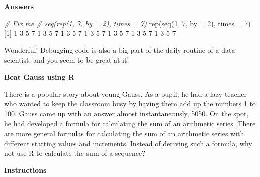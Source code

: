 \documentclass[]{article}
\newcommand{\hlnum}[1]{\textcolor[rgb]{0.816,0.125,0.439}{#1}}%
\newcommand{\hlcom}[1]{\textcolor[rgb]{0.502,0.502,0.502}{\textit{#1}}}%
\newcommand{\hlstd}[1]{\textcolor[rgb]{0.251,0.251,0.251}{#1}}%
\newcommand{\hlkwc}[1]{\textcolor[rgb]{0.251,0.251,0.251}{#1}}%
\newcommand{\hlkwd}[1]{\textcolor[rgb]{0.878,0.439,0.125}{#1}}%
\newenvironment{Shaded}{\begin{myshaded}}{\end{myshaded}}
\newcommand{\KeywordTok}[1]{\hlkwd{#1}}
\newcommand{\DataTypeTok}[1]{\hlkwc{#1}}
\newcommand{\DecValTok}[1]{\hlnum{#1}}
\newcommand{\CommentTok}[1]{\hlcom{#1}}
\newcommand{\NormalTok}[1]{\hlstd{#1}}
\begin{document}
\textbf{Answers}

\begin{Shaded}
\begin{Highlighting}[]
\CommentTok{# Fix me}
\CommentTok{# seq(rep(1, 7, by = 2), times = 7)}
\KeywordTok{rep}\NormalTok{(}\KeywordTok{seq}\NormalTok{(}\DecValTok{1}\NormalTok{, }\DecValTok{7}\NormalTok{, }\DataTypeTok{by =} \DecValTok{2}\NormalTok{), }\DataTypeTok{times =} \DecValTok{7}\NormalTok{)}
\NormalTok{    [}\DecValTok{1}\NormalTok{] }\DecValTok{1} \DecValTok{3} \DecValTok{5} \DecValTok{7} \DecValTok{1} \DecValTok{3} \DecValTok{5} \DecValTok{7} \DecValTok{1} \DecValTok{3} \DecValTok{5} \DecValTok{7} \DecValTok{1} \DecValTok{3} \DecValTok{5} \DecValTok{7} \DecValTok{1} \DecValTok{3} \DecValTok{5} \DecValTok{7} \DecValTok{1} \DecValTok{3} \DecValTok{5} \DecValTok{7} \DecValTok{1} \DecValTok{3} \DecValTok{5} \DecValTok{7}
\end{Highlighting}
\end{Shaded}

Wonderful! Debugging code is also a big part of the daily routine of a
data scientist, and you seem to be great at it!

\textbf{Beat Gauss using R}

There is a popular story about young Gauss. As a pupil, he had a lazy
teacher who wanted to keep the classroom busy by having them add up the
numbers 1 to 100. Gauss came up with an answer almost instantaneously,
5050. On the spot, he had developed a formula for calculating the sum of
an arithmetic series. There are more general formulas for calculating
the sum of an arithmetic series with different starting values and
increments. Instead of deriving such a formula, why not use R to
calculate the sum of a sequence?

\textbf{Instructions}
\end{document}
